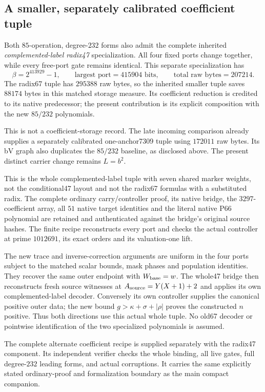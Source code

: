 \documentclass[11pt]{article}
\begin{document}
\subsection{A smaller, separately calibrated coefficient tuple}

Both $85$-operation, degree-$232$ forms also admit the complete inherited
\emph{complemented-label radix47} specialization.  All four fixed ports
change together, while every free-port gate remains identical.  This
separate specialization has
\[
 \beta=2^{413929}-1,\qquad
 \text{largest port}=415904\text{ bits},\qquad
 \text{total raw bytes}=207214.
\]
The radix67 tuple has $295388$ raw bytes, so the inherited smaller tuple
saves $88174$ bytes in this matched storage measure.  Its coefficient
reduction is credited to its native predecessor; the present contribution
is its explicit composition with the new $85/232$ polynomials.

This is not a coefficient-storage record.  The late incoming comparison
already supplies a separately calibrated one-anchor7309 tuple using
$172011$ raw bytes.  Its bV graph also duplicates the $85/232$ baseline,
as disclosed above.  The present distinct carrier change remains $L=b^2$.

This is the whole complemented-label tuple with seven shared marker weights,
not the conditional47 layout and not the radix67 formulas with a substituted
radix.  The complete ordinary carry/controller proof, its native bridge,
the $3297$-coefficient array, all $51$ native target identities and the
literal native P66 polynomial are retained and authenticated against the
bridge's original source hashes.  The finite recipe reconstructs every
port and checks the actual controller at prime $1012691$, its exact orders
and its valuation-one lift.

The new trace and inverse-correction arguments are uniform in the four
ports subject to the matched scalar bounds, mask phases and population
identities.  They recover the same outer endpoint with $W_{\rm base}=w$.
The whole47 bridge then reconstructs fresh source witnesses at
$A_{\rm source}=Y(X+1)+2$ and applies its own complemented-label decoder.
Conversely its own controller supplies the canonical positive outer data;
the new bound $g>\kappa+\sigma+|\rho|$ proves the constructed $n$ positive.
Thus both directions use this actual whole tuple.  No old67 decoder or
pointwise identification of the two specialized polynomials is assumed.

The complete alternate coefficient recipe is supplied separately with the
radix47 component.  Its independent verifier checks the whole binding,
all live gates, full degree-$232$ leading forms, and actual corruptions.
It carries the same explicitly stated ordinary-proof and formalization
boundary as the main compact companion.
\end{document}
